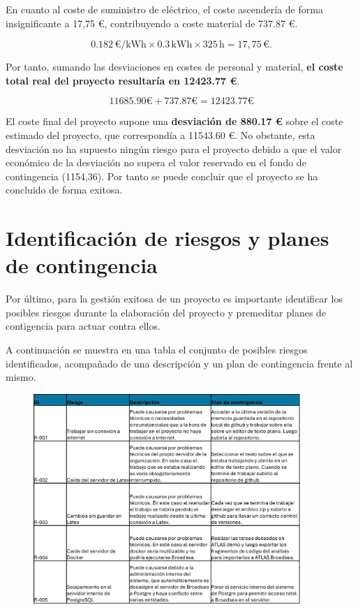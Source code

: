 En cuanto al coste de suministro de eléctrico, el coste ascendería de forma insignificante a 17,75 €, contribuyendo a coste material de 737.87 €. 

\begin{equation}
0.182 \, \text{€/kWh} \times 0.3 \, \text{kWh} \times 325 \, \text{h} = 17,75 \, \text{€}.
\end{equation}

Por tanto, sumando las desviaciones en costes de personal y material, \textbf{el coste total real del proyecto resultaría en 12423.77 €}.

\begin{equation}
    11685.90 \text{€} + 737.87\text{€} =  12423.77 \text{€}
\end{equation}

El coste final del proyecto supone una\textbf{ desviación de 880.17 €} sobre el coste estimado del proyecto, que correspondía a 11543.60 €. No obstante, esta desviación no ha supuesto ningún riesgo para el proyecto debido a que el valor económico de la desviación no supera el valor reservado en el fondo de contingencia (1154,36). Por tanto se puede concluir que el proyecto se ha concluido de forma exitosa.

\section{Identificación de riesgos y planes de contingencia} \label{sec:03Riesgos}

Por último, para la gestión exitosa de un proyecto es importante identificar los posibles riesgos durante la elaboración del proyecto y premeditar planes de contigencia para actuar contra ellos. 

A continuación se muestra en una tabla el conjunto de posibles riesgos identificados, acompañado de una descripción y un plan de contingencia frente al mismo.

\begin{figure}[H]
    \centering
    \includegraphics[width=0.90\textwidth]{tables/tablaRiesgos.jpg}
    \label{table:tablaRiesgos}
\end{figure}

